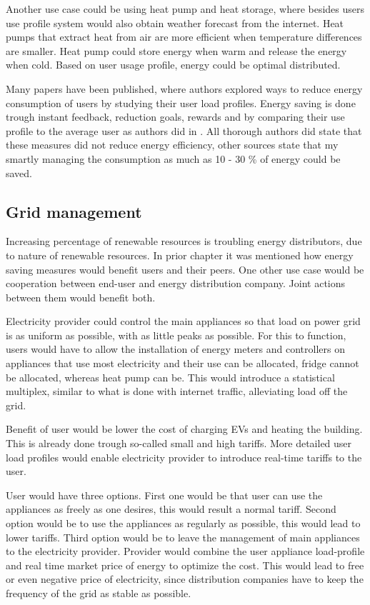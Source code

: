 \documentclass[
11pt, %
english, %
singlespacing, %
headsepline, %
]{MastersDoctoralThesis} %
\begin{document}
Another use case could be using heat pump and heat storage,
where besides users use profile system would also obtain weather forecast from the internet.
Heat pumps that extract heat from air are more efficient when temperature differences are smaller. 
Heat pump could store energy when warm and release the energy when cold.
Based on user usage profile, energy could be optimal distributed.

Many papers have been published, where authors explored ways to reduce energy consumption of users by studying their user load profiles.
Energy saving is done trough instant feedback, reduction goals, rewards and by comparing their use profile to the average user as authors did in \cite{Csoknyai2019}.
All thorough authors did state that these measures did not reduce energy efficiency, other sources state that my smartly managing the consumption 
as much as 10 - 30 \% of energy could be saved. 

\subsection{Grid management}

Increasing percentage of renewable resources is troubling energy distributors, due to nature of renewable resources.
In prior chapter it was mentioned how energy saving measures would benefit users and their peers.
One other use case would be cooperation between end-user and energy distribution company.
Joint actions between them would benefit both.

Electricity provider could control the main appliances so that load on power grid is as uniform as possible,
with as little peaks as possible. For this to function, users would have to allow the installation of energy meters and controllers 
on appliances that use most electricity and their use can be allocated, fridge cannot be allocated, whereas heat pump can be.
This would introduce a statistical multiplex, similar to what is done with internet traffic, alleviating load off the grid. 

Benefit of user would be lower the cost of charging EVs and heating the building.
This is already done trough so-called small and high tariffs.
More detailed user load profiles would enable electricity provider to introduce real-time tariffs to the user.

User would have three options. First one would be that user can use the appliances as freely as one desires, this would result a normal tariff.
Second option would be to use the appliances as regularly as possible, this would lead to lower tariffs.
Third option would be to leave the management of main appliances to the electricity provider.
Provider would combine the user appliance load-profile and real time market price of energy to optimize the cost. 
This would lead to free or even negative price of electricity, since distribution companies have to keep the frequency of the grid as stable as possible.
\end{document}
